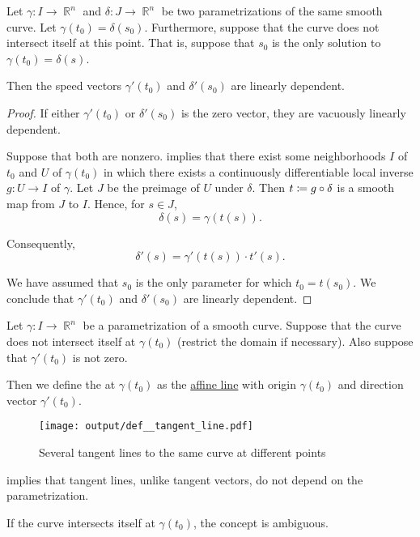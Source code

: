 \begin{proposition}\label{thm:tangent_vector_dependent}
  Let \( \gamma: I \to \BbbR^n \) and \( \delta: J \to \BbbR^n \) be two parametrizations of the same smooth curve. Let \( \gamma(t_0) = \delta(s_0) \). Furthermore, suppose that the curve does not intersect itself at this point. That is, suppose that \( s_0 \) is the only solution to \( \gamma(t_0) = \delta(s) \).

  Then the speed vectors \( \gamma'(t_0) \) and \( \delta'(s_0) \) are linearly dependent.
\end{proposition}
\begin{proof}
  If either \( \gamma'(t_0) \) or \( \delta'(s_0) \) is the zero vector, they are vacuously linearly dependent.

  Suppose that both are nonzero.  implies that there exist some neighborhoods \( I \) of \( t_0 \) and \( U \) of \( \gamma(t_0) \) in which there exists a continuously differentiable local inverse \( g: U \to I \) of \( \gamma \). Let \( J \) be the preimage of \( U \) under \( \delta \). Then \( t \coloneqq g \bincirc \delta \) is a smooth map from \( J \) to \( I \). Hence, for \( s \in J \),
  \begin{equation*}
    \delta(s) = \gamma(t(s)).
  \end{equation*}

  Consequently,
  \begin{equation*}
    \delta'(s) = \gamma'(t(s)) \cdot t'(s).
  \end{equation*}

  We have assumed that \( s_0 \) is the only parameter for which \( t_0 = t(s_0) \). We conclude that \( \gamma'(t_0) \) and \( \delta'(s_0) \) are linearly dependent.
\end{proof}

\begin{definition}\label{def:tangent_line}
  Let \( \gamma: I \to \BbbR^n \) be a parametrization of a smooth curve. Suppose that the curve does not intersect itself at \( \gamma(t_0) \) (restrict the domain if necessary). Also suppose that \( \gamma'(t_0) \) is not zero.

  Then we define the  at \( \gamma(t_0) \) as the \hyperref[def:affine_line]{affine line} with origin \( \gamma(t_0) \) and direction vector \( \gamma'(t_0) \).

  \begin{figure}[!ht]
    \centering
    \texttt{[image: output/def\_\_tangent\_line.pdf]}
    \caption{Several tangent lines to the same curve at different points}\label{fig:def:tangent_line}
  \end{figure}

   implies that tangent lines, unlike tangent vectors, do not depend on the parametrization.

  If the curve intersects itself at \( \gamma(t_0) \), the concept is ambiguous.
\end{definition}

